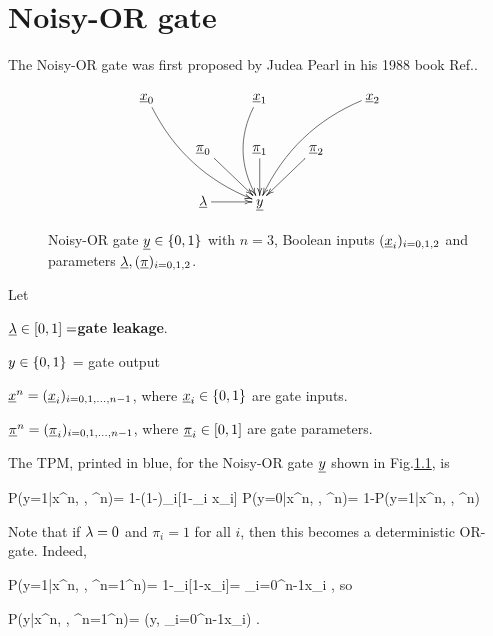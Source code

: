 \chapter{Noisy-OR gate}
The Noisy-OR gate was first
proposed by Judea Pearl in his 1988 book
 Ref.\cite{pearl-1988book}.
\begin{figure}[h!]
$$\xymatrix{
\rvx_0\ar@/_1pc/[ddrr]
&&\rvx_1\ar@/_1pc/[dd]
&&\rvx_2\ar@/_1pc/[ddll]
\\
&\ul{\pi}_0\ar[dr]
&\ul{\pi}_1\ar[d]
&\ul{\pi}_2\ar[dl]
\\
&\ul{\lam}\ar[r]
&\rvy
}$$
\caption{Noisy-OR gate ${\underline{y}}\in\{0,1\}$
with $n=3$, Boolean inputs $({\underline{x}}_i)_{i=0,1,2}$
and parameters 
$\underline{\lambda}, (\underline{\pi})_{i=0,1,2}$.
}
\label{fig-noisy-or-simple}
\end{figure}

Let

$\underline{\lambda}\in [0, 1]=${\bf gate leakage}.

$y\in \{0,1\}$ = gate  output

${\underline{x}}^n=({\underline{x}}_i)_{i=0,1, \ldots, n-1}$, where
${\underline{x}}_i\in\{0,1\}$ are
 gate inputs.

$\underline{\pi}^n=(\underline{\pi}_i)_{i=0,1, \ldots, n-1}$, where
$\underline{\pi}_i\in[0,1]$ are
 gate parameters.


The TPM, printed in blue,
 for the Noisy-OR gate ${\underline{y}}$ 
shown in Fig.\ref{fig-noisy-or-simple},
 is

\beq\color{blue}
P(y=1|x^n, \lam, \pi^n)=
1-(1-\lam)\prod_i[1-\pi_i x_i]
\label{eq-noisy-or-tmp-1}
\eeq
\beq\color{blue}
P(y=0|x^n, \lam, \pi^n)=
1-P(y=1|x^n, \lam, \pi^n)
\eeq

Note
that if $\lambda=0$ and $\pi_i=1$ for all $i$,
then this becomes 
a deterministic OR-gate. Indeed,

\beq
P(y=1|x^n, , \pi^n=1^n)= 1-\prod_i[1-x_i]=
\V_{i=0}^{n-1}x_i
\;,
\eeq
so 

\beq
P(y|x^n, , \pi^n=1^n)=
\delta(y, \V_{i=0}^{n-1}x_i)
\;.
\eeq

